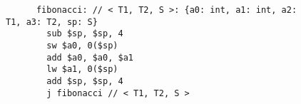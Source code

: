 \begin{figure}
\begin{verbatim}
      fibonacci: // < T1, T2, S >: {a0: int, a1: int, a2: T1, a3: T2, sp: S}
        sub $sp, $sp, 4
        sw $a0, 0($sp)
        add $a0, $a0, $a1
        lw $a1, 0($sp)
        add $sp, $sp, 4
        j fibonacci // < T1, T2, S >
\end{verbatim}

\begin{code}
  \> \AgdaSymbol{=}\<%
  \\
  \>[0]\<[2]%
  \>[2]\AgdaInductiveConstructor{code[} \AgdaInductiveConstructor{$\alpha$}  \AgdaInductiveConstructor{$\alpha$}  \AgdaInductiveConstructor{$\rho$}  \AgdaInductiveConstructor{[]} \AgdaInductiveConstructor{]}\<%
  \\
  \>[0]\<[2]%
  \>[2] \AgdaSymbol{(} \AgdaSymbol{)} \AgdaSymbol{(}          \AgdaInductiveConstructor{[]}\AgdaSymbol{)} \<%
  \\
  \>[2]\<[5]%
  \>[5]  \AgdaInductiveConstructor{\textasciitilde>}\<%
  \\
  \>[2]\<[5]%
  \>[5]  \AgdaSymbol{(}\AgdaFunction{\#} \AgdaSymbol{)} \AgdaInductiveConstructor{\textasciitilde>}\<%
  \\
  \>[2]\<[5]%
  \>[5] \AgdaSymbol{(}\AgdaFunction{\#} \AgdaSymbol{)} \AgdaSymbol{(}\AgdaFunction{\#} \AgdaSymbol{)} \AgdaSymbol{(} \AgdaSymbol{(}\AgdaFunction{\#} \AgdaSymbol{))} \AgdaInductiveConstructor{\textasciitilde>}\<%
  \\
  \>[2]\<[5]%
  \>[5] \AgdaSymbol{(}\AgdaFunction{\#} \AgdaSymbol{)}  \AgdaInductiveConstructor{\textasciitilde>}\<%
  \\
  \>[2]\<[5]%
  \>[5]  \AgdaInductiveConstructor{\textasciitilde>}\<%

\end{code}
\end{figure}
